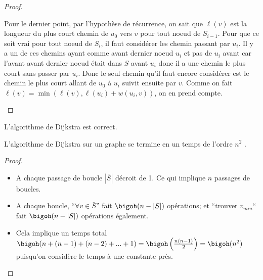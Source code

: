 \begin{mytheo} 
\begin{proof}
\begin{description}
\begin{itemize}
            Pour le dernier point,
            par l'hypothèse de récurrence, on sait que $\ell(v)$ est la longueur du plus court
            chemin de $u_0$ vers $v$ pour tout noeud de $S_{i-1}$.
            Pour que ce soit vrai pour tout noeud de $S_i$, il faut considérer les chemin passant
            par $u_i$.
            Il y a un de ces chemins ayant comme avant dernier noeud $u_i$ et pas de $u_i$ avant
            car l'avant avant dernier noeud était dans $S$ avant $u_i$ donc il a une chemin
            le plus court sans passer par $u_i$.
            Donc le seul chemin qu'il faut encore considérer est le chemin le plus court
            allant de $u_0$ à $u_i$ suivit ensuite par $v$.
            Comme on fait $\ell(v) = \min(\ell(v), \ell(u_i) + w(u_i, v))$, on en prend compte.
        \end{itemize}
    \end{description}
  \end{proof}
\end{mytheo}

\begin{mycorr} 
  L’algorithme de Dijkstra est correct.
\end{mycorr}

\begin{mytheo} 
  L’algorithme de Dijkstra sur un graphe se termine en un temps de l’ordre $n^2$ .
  \begin{proof}
    \noindent
    \begin{itemize}
      \item A chaque passage de boucle $|\bar{S}|$ décroit de 1. Ce qui implique $n$ passages de boucles.
      \item A chaque boucle, ``$\forall v \in \bar{S}$'' fait $\bigoh(n-|S|)$ opérations;
        et ``trouver $v_{min}$`` fait $\bigoh(n-|S|)$ opérations également.
      \item Cela implique un temps total $\bigoh(n + (n-1) + (n-2) + ... + 1) = \bigoh\left( \frac{n(n-1)}{2} \right) = \bigoh(n^2)$
        puisqu'on considère le temps à une constante près.
    \end{itemize}
  \end{proof}
\end{mytheo}

